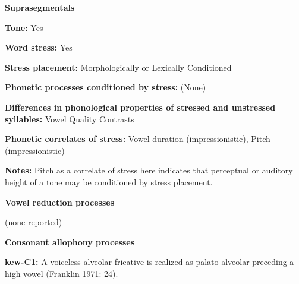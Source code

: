 \begin{styleBody}
\textbf{Suprasegmentals}
\end{styleBody}

\begin{styleBody}
\textbf{Tone:} Yes
\end{styleBody}

\begin{styleBody}
\textbf{Word stress:} Yes
\end{styleBody}

\begin{styleBody}
\textbf{Stress placement:} Morphologically or Lexically Conditioned
\end{styleBody}

\begin{styleBody}
\textbf{Phonetic processes conditioned by stress:} (None)
\end{styleBody}

\begin{styleBody}
\textbf{Differences in phonological properties of stressed and unstressed syllables:} Vowel Quality Contrasts
\end{styleBody}

\begin{styleBody}
\textbf{Phonetic correlates of stress: }Vowel duration (impressionistic), Pitch (impressionistic)
\end{styleBody}

\begin{styleBody}
\textbf{Notes: }Pitch as a correlate of stress here indicates that perceptual or auditory height of a tone may be conditioned by stress placement.
\end{styleBody}

\begin{styleBody}
\textbf{Vowel reduction processes}
\end{styleBody}

\begin{styleBody}
(none reported)
\end{styleBody}

\begin{styleBody}
\textbf{Consonant allophony processes}
\end{styleBody}

\begin{styleBody}
\textbf{kew-C1: }A voiceless alveolar fricative is realized as palato-alveolar preceding a high vowel (Franklin 1971: 24).
\end{styleBody}

